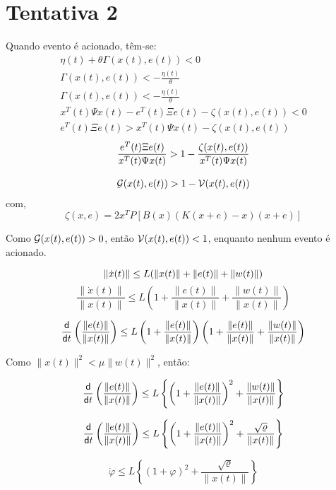 \section{Tentativa 2}

Quando evento é acionado, têm-se:
\begin{gather}
  \eta(t) + \theta \Gamma(x(t), e(t)) < 0 \\[8pt]
  \Gamma(x(t), e(t)) < - \frac{\eta(t)}{\theta} \\[8pt]
  \Gamma(x(t), e(t)) < - \frac{\eta(t)}{\theta} \\
  x^T(t) \Psi x(t) - e^T(t) \Xi e(t) - \zeta(x(t), e(t)) < 0 \\[8pt]
  e^T(t) \Xi e(t)  >  x^T(t) \Psi x(t) - \zeta(x(t), e(t))
\end{gather}
\begin{gather}
  \frac{e^T(t) \Xi e(t)}{x^T(t) \Psi x(t)}  >  1 - \frac{\zeta(x(t), e(t))}{x^T(t) \Psi x(t)} \\[8pt]
  {\cal G}(x(t), e(t)) >  1 - {\cal V}(x(t), e(t))
\end{gather}
com,
\begin{equation}
  \zeta(x, e) = 2 x^T P\left[B(x) \left(K(x+e) - x\right)(x+e)\right]
\end{equation}

Como ${\cal G}(x(t), e(t)) > 0$, então ${\cal V}(x(t), e(t)) < 1$, enquanto nenhum evento é acionado.

\begin{equation}
  \|\dot x(t)\| \leq L(\|x(t)\| + \|e(t)\| + \|w(t)\|) \\[8pt]
\end{equation}
\begin{equation}
  \frac{\|\dot x(t)\|}{\|x(t)\|} \leq L\left(1 + \frac{\|e(t)\|}{\|x(t)\|} + \frac{\|w(t)\|}{\|x(t)\|}\right)
\end{equation}


\begin{equation}
  \frac{\sf d}{{\sf d}t} \left(\frac{\|e(t)\|}{\|x(t)\|}\right) \leq L \left(1 + \frac{\|e(t)\|}{\|x(t)\|}\right) \left(1 + \frac{\|e(t)\|}{\|x(t)\|} + \frac{\|w(t)\|}{\|x(t)\|}\right)
\end{equation}

Como $\|x(t)\|^2 < \mu \|w(t)\|^2$, então:

\begin{equation}
  \frac{\sf d}{{\sf d}t} \left(\frac{\|e(t)\|}{\|x(t)\|}\right) \leq L \left\{\left(1 + \frac{\|e(t)\|}{\|x(t)\|}\right)^2 + \frac{\|w(t)\|}{\|x(t)\|} \right\}
\end{equation}

\begin{equation}
  \frac{\sf d}{{\sf d}t} \left(\frac{\|e(t)\|}{\|x(t)\|}\right)
  \leq L \left\{\left(1 + \frac{\|e(t)\|}{\|x(t)\|}\right)^2 + \frac{\sqrt{\varrho}}{\|x(t)\|} \right\}
\end{equation}

\begin{equation}
  \dot \varphi \leq L \left\{\left(1 + \varphi\right)^2 + \frac{\sqrt{\varrho}}{\|x(t)\|} \right\}
\end{equation}
